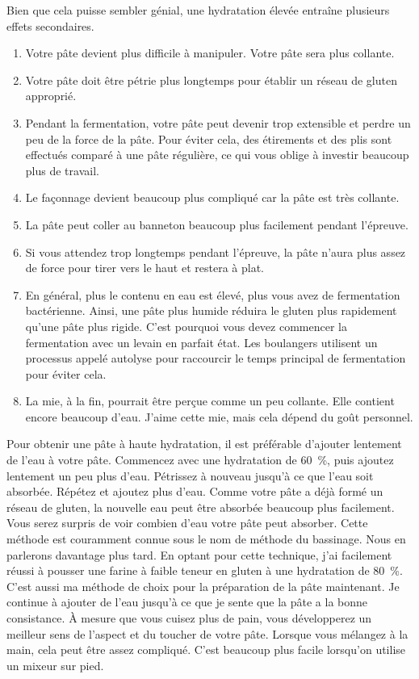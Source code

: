 Bien que cela puisse sembler génial, une hydratation élevée entraîne plusieurs effets secondaires.

\begin{enumerate}
  \item Votre pâte devient plus difficile à manipuler. Votre pâte sera plus collante.
  \item Votre pâte doit être pétrie plus longtemps pour établir un réseau de gluten
    approprié.
  \item Pendant la fermentation, votre pâte peut devenir trop extensible et perdre
    un peu de la force de la pâte. Pour éviter cela, des étirements et des plis sont effectués
    comparé à une pâte régulière,
    ce qui vous oblige à investir beaucoup plus de travail.
  \item Le façonnage devient beaucoup plus compliqué car la pâte est très collante.
  \item La pâte peut coller au banneton beaucoup plus facilement pendant l'épreuve.
  \item Si vous attendez trop longtemps pendant l'épreuve, la pâte n'aura plus assez de force
    pour tirer vers le haut et restera à plat.
  \item En général, plus le contenu en eau est élevé, plus vous avez de fermentation bactérienne.
    Ainsi, une pâte plus humide réduira le gluten plus rapidement qu'une pâte plus rigide.
    C'est pourquoi vous devez commencer la fermentation avec un levain en
    parfait état. Les boulangers utilisent un processus appelé autolyse pour raccourcir le temps principal
    de fermentation pour éviter cela.  
  \item La mie, à la fin, pourrait être perçue comme un peu collante. Elle contient encore
    beaucoup d'eau. J'aime cette mie, mais cela dépend du goût personnel.
\end{enumerate}Pour obtenir une pâte à haute hydratation, il est préférable d'ajouter lentement de l'eau à votre pâte. Commencez avec une hydratation de \qty{60}{\percent}, puis ajoutez lentement un peu plus d'eau. Pétrissez à nouveau jusqu'à ce que l'eau soit absorbée. Répétez et ajoutez plus d'eau. Comme votre pâte a déjà formé un réseau de gluten, la nouvelle eau peut être absorbée beaucoup plus facilement. Vous serez surpris de voir combien d'eau votre pâte peut absorber. Cette méthode est couramment connue sous le nom de méthode du bassinage. Nous en parlerons davantage plus tard.
En optant pour cette technique, j'ai facilement réussi à pousser une farine à faible teneur en gluten à une hydratation de \qty{80}{\percent}. C'est aussi ma méthode de choix pour la préparation de la pâte maintenant. Je continue à ajouter de l'eau jusqu'à ce que je sente que la pâte a la bonne consistance. À mesure que vous cuisez plus de pain, vous développerez un meilleur sens de l'aspect et du toucher de votre pâte. Lorsque vous mélangez à la main, cela peut être assez compliqué. C'est beaucoup plus facile lorsqu'on utilise un mixeur sur pied.

